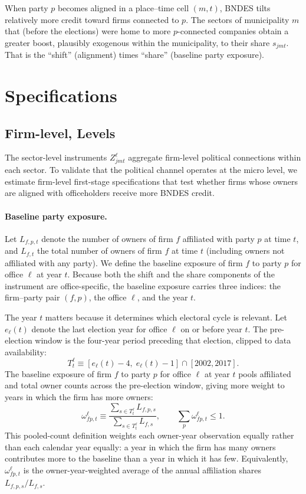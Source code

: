 \documentclass{article}
\begin{document}
When party $p$ becomes aligned in a place–time cell $(m,t)$, BNDES tilts relatively more credit toward firms connected to $p$. The sectors of municipality $m$ that (before the elections) were home to more $p$-connected companies obtain a greater boost, plausibly exogenous within the municipality, to their share $s_{jmt}$. That is the “shift” (alignment) times “share” (baseline party exposure).

\section{Specifications}


\subsection{Firm-level, Levels}

The sector-level instruments $Z^{\ell}_{jmt}$ aggregate firm-level political connections within each sector. To validate that the political channel operates at the micro level, we estimate firm-level first-stage specifications that test whether firms whose owners are aligned with officeholders receive more BNDES credit.

\paragraph{Baseline party exposure.}
Let $L_{f,p,t}$ denote the number of owners of firm $f$ affiliated with party $p$ at time $t$, and $L_{f,t}$ the total number of owners of firm $f$ at time $t$ (including owners not affiliated with any party). We define the baseline exposure of firm $f$ to party $p$ for office $\ell$ at year $t$. Because both the shift and the share components of the instrument are office-specific, the baseline exposure carries three indices: the firm--party pair $(f,p)$, the office $\ell$, and the year $t$.

The year $t$ matters because it determines which electoral cycle is relevant. Let $e_\ell(t)$ denote the last election year for office $\ell$ on or before year $t$. The pre-election window is the four-year period preceding that election, clipped to data availability:
\[
  T^\ell_t \equiv [e_\ell(t) - 4,\; e_\ell(t) - 1] \cap [2002, 2017].
\]
The baseline exposure of firm $f$ to party $p$ for office $\ell$ at year $t$ pools affiliated and total owner counts across the pre-election window, giving more weight to years in which the firm has more owners:
\[
  \omega^\ell_{fp,t} \equiv
  \frac{\sum_{s \in T^\ell_t} L_{f,p,s}}{\sum_{s \in T^\ell_t} L_{f,s}},
  \qquad
  \sum_{p} \omega^\ell_{fp,t} \leq 1.
\]
This pooled-count definition weights each owner-year observation equally rather than each calendar year equally: a year in which the firm has many owners contributes more to the baseline than a year in which it has few. Equivalently, $\omega^\ell_{fp,t}$ is the owner-year-weighted average of the annual affiliation shares $L_{f,p,s}/L_{f,s}$.
\end{document}
